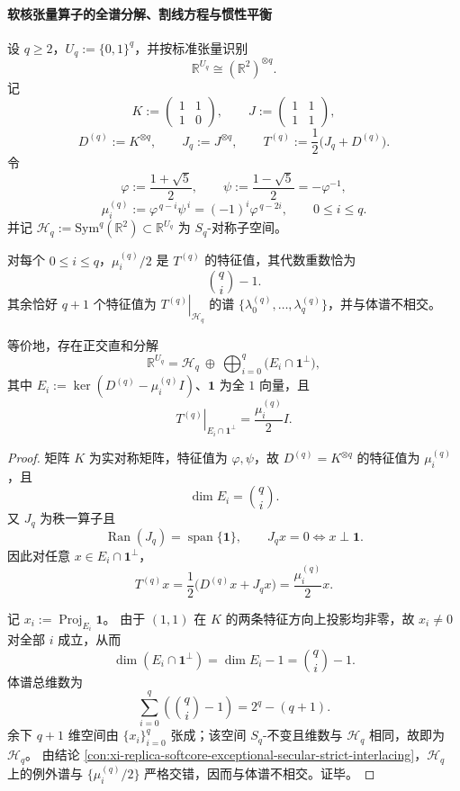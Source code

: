 \paragraph{软核张量算子的全谱分解、割线方程与惯性平衡}
设 \(q\ge2\)，\(U_q:=\{0,1\}^q\)，并按标准张量识别
\[
\mathbb R^{U_q}\cong(\mathbb R^2)^{\otimes q}.
\]
记
\[
K:=\begin{pmatrix}1&1\\[2pt]1&0\end{pmatrix},
\qquad
J:=\begin{pmatrix}1&1\\[2pt]1&1\end{pmatrix},
\]
\[
D^{(q)}:=K^{\otimes q},
\qquad
J_q:=J^{\otimes q},
\qquad
T^{(q)}:=\frac12\bigl(J_q+D^{(q)}\bigr).
\]
令
\[
\varphi:=\frac{1+\sqrt5}{2},
\qquad
\psi:=\frac{1-\sqrt5}{2}=-\varphi^{-1},
\]
\[
\mu_i^{(q)}:=\varphi^{\,q-i}\psi^{\,i}=(-1)^i\varphi^{\,q-2i},
\qquad 0\le i\le q.
\]
并记 \(\mathcal H_q:=\mathrm{Sym}^q(\mathbb R^2)\subset\mathbb R^{U_q}\) 为 \(S_q\)-对称子空间。

\begin{theorem}\label{thm:xi-replica-softcore-full-spectrum-direct-sum}
对每个 \(0\le i\le q\)，\(\mu_i^{(q)}/2\) 是 \(T^{(q)}\) 的特征值，其代数重数恰为
\[
\binom{q}{i}-1.
\]
其余恰好 \(q+1\) 个特征值为 \(\left.T^{(q)}\right|_{\mathcal H_q}\) 的谱
\(\{\lambda_0^{(q)},\dots,\lambda_q^{(q)}\}\)，并与体谱不相交。

等价地，存在正交直和分解
\[
\mathbb R^{U_q}
=
\mathcal H_q\ \oplus\
\bigoplus_{i=0}^{q}\bigl(E_i\cap\mathbf 1^\perp\bigr),
\]
其中 \(E_i:=\ker(D^{(q)}-\mu_i^{(q)}I)\)、\(\mathbf1\) 为全 \(1\) 向量，且
\[
\left.T^{(q)}\right|_{E_i\cap\mathbf1^\perp}
=
\frac{\mu_i^{(q)}}{2}I.
\]
\end{theorem}
\begin{proof}
矩阵 \(K\) 为实对称矩阵，特征值为 \(\varphi,\psi\)，故 \(D^{(q)}=K^{\otimes q}\) 的特征值为
\(\mu_i^{(q)}\)，且
\[
\dim E_i=\binom{q}{i}.
\]
又 \(J_q\) 为秩一算子且
\[
\operatorname{Ran}(J_q)=\operatorname{span}\{\mathbf1\},
\qquad
J_qx=0\iff x\perp\mathbf1.
\]
因此对任意 \(x\in E_i\cap\mathbf1^\perp\)，
\[
T^{(q)}x=\frac12\bigl(D^{(q)}x+J_qx\bigr)=\frac{\mu_i^{(q)}}2x.
\]

记 \(x_i:=\operatorname{Proj}_{E_i}\mathbf1\)。
由于 \((1,1)\) 在 \(K\) 的两条特征方向上投影均非零，故 \(x_i\neq0\) 对全部 \(i\) 成立，从而
\[
\dim(E_i\cap\mathbf1^\perp)=\dim E_i-1=\binom{q}{i}-1.
\]
体谱总维数为
\[
\sum_{i=0}^{q}\left(\binom{q}{i}-1\right)=2^q-(q+1).
\]
余下 \(q+1\) 维空间由 \(\{x_i\}_{i=0}^{q}\) 张成；该空间 \(S_q\)-不变且维数与 \(\mathcal H_q\) 相同，故即为 \(\mathcal H_q\)。
由结论 \ref{con:xi-replica-softcore-exceptional-secular-strict-interlacing}，\(\mathcal H_q\) 上的例外谱与 \(\{\mu_i^{(q)}/2\}\) 严格交错，因而与体谱不相交。证毕。
\end{proof}

